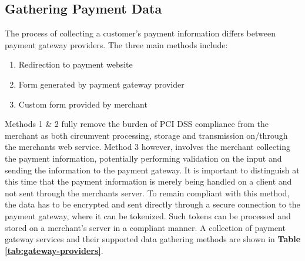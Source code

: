\subsection{Gathering Payment Data}
\label{subsec:gathering-payment-data}

The process of collecting a customer's payment information differs between payment gateway providers. The three main methods include:

\begin{enumerate}
	\item Redirection to payment website
    \item Form generated by payment gateway provider
    \item Custom form provided by merchant
\end{enumerate}

Methods 1 \& 2 fully remove the burden of PCI DSS compliance from the merchant as both circumvent processing, storage and transmission on/through the merchants web service. Method 3 however, involves the merchant collecting the payment information, potentially performing validation on the input and sending the information to the payment gateway. It is important to distinguish at this time that the payment information is merely being handled on a client and not sent through the merchants server. To remain compliant with this method, the data has to be encrypted and sent directly through a secure connection to the payment gateway, where it can be tokenized. Such tokens can be processed and stored on a merchant's server in a compliant manner. A collection of payment gateway services and their supported data gathering methods are shown in \textbf{Table \ref{tab:gateway-providers}}. \\

